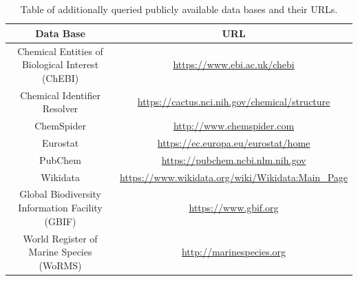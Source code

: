 \documentclass[journal,datadescriptor,accept,moreauthors,pdftex]{Definitions/mdpi}
\begin{document}
\section{}
\begin{table}[H]
    \caption{Table of additionally queried publicly available data bases and their URLs.}
    \label{tab:data-base-additional}
    \centering
\begin{tabular}{cc}
    \toprule
    \textbf{Data Base} & \textbf{URL} \\ 
    \midrule
    \makecell{Chemical Entities of \\ Biological Interest (ChEBI)} & \url{https://www.ebi.ac.uk/chebi}  \\
    Chemical Identifier Resolver & \url{https://cactus.nci.nih.gov/chemical/structure}  \\[0.5cm]
    ChemSpider & \url{http://www.chemspider.com}    \\[0.5cm]
    Eurostat & \url{https://ec.europa.eu/eurostat/home} \\[0.5cm]
    PubChem & \url{https://pubchem.ncbi.nlm.nih.gov} \\[0.5cm]
    Wikidata & \url{https://www.wikidata.org/wiki/Wikidata:Main_Page} \\[0.5cm]
    \makecell{Global Biodiversity \\ Information Facility (GBIF)} & \url{https://www.gbif.org} \\[0.5cm]
    \makecell{World Register of \\ Marine Species (WoRMS)} & \url{http://marinespecies.org} \\
    \bottomrule
\end{tabular}
\end{table}
\end{document}
